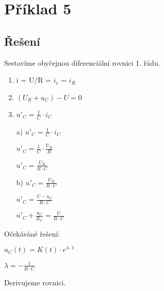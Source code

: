 \section{Příklad 5}

\subsection{Řešení}
\begin{large}
\flushleft
Sestavíme obyčejnou diferenciální rovnici 1. řádu.
\end{large}

\begin{enumerate}
    \item i = U/R = $i_c$ = $i_R$
    \item $(U_R + u_C) - U = 0$
    \item $u'_C = \frac{1}{C} \cdot i_C$
\end{enumerate}

\begin{enumerate}
    \item[a)] $u'_C = \frac{1}{C} \cdot i_C$
    
    \vspace{0.25cm}
    $u'_C = \frac{1}{C} \cdot \frac{U_R}{R}$
    
    \vspace{0.25cm}
    $u'_C = \frac{U_R}{R \cdot C}$
    
    \vspace{0.25cm}
    \item[b)] $u'_C = \frac{U_R}{R \cdot C}$
    
    \vspace{0.25cm}
    $u'_C = \frac{U - u_C}{R \cdot C}$
    
    \vspace{0.25cm}
    $u'_C + \frac{u_C}{R_C} = \frac{U}{R \cdot C}$
\end{enumerate}

\begin{large}
\vspace{1cm} \flushleft
Očekáváné řešení:
\end{large}

\vspace{0.5cm}
$u_C(t) = K(t) \cdot e^{\lambda \cdot t}$

\vspace{0.25cm}
$\lambda = -\frac{1}{R \cdot C}$

\begin{large}
\vspace{1cm} \flushleft
Derivujeme rovnici.
\end{large}

